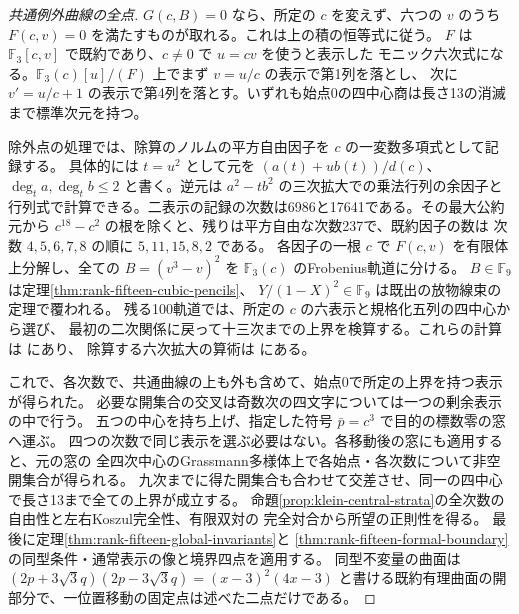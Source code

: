 \begin{proof}[共通例外曲線の全点]
$G(c,B)=0$ なら、所定の $c$ を変えず、六つの $v$ のうち
$F(c,v)=0$ を満たすものが取れる。これは上の積の恒等式に従う。
$F$ は $\mathbb F_3[c,v]$ で既約であり、$c\ne0$ で $u=cv$ を使うと表示した
モニック六次式になる。$\mathbb F_3(c)[u]/(F)$ 上でまず $v=u/c$ の表示で第1列を落とし、
次に $v'=u/c+1$ の表示で第4列を落とす。いずれも始点0の四中心商は長さ13の消滅まで標準次元を持つ。

除外点の処理では、除算のノルムの平方自由因子を $c$ の一変数多項式として記録する。
具体的には $t=u^2$ として元を $(a(t)+u b(t))/d(c)$、
$\deg_t a,\deg_t b\le2$ と書く。逆元は $a^2-t b^2$ の三次拡大での乗法行列の余因子と
行列式で計算できる。二表示の記録の次数は6986と17641である。その最大公約元から
$c^{18}-c^2$ の根を除くと、残りは平方自由な次数237で、既約因子の数は
次数 $4,5,6,7,8$ の順に $5,11,15,8,2$ である。
各因子の一根 $c$ で $F(c,v)$ を有限体上分解し、全ての $B=(v^3-v)^2$ を
$\mathbb F_3(c)$ のFrobenius軌道に分ける。
$B\in\mathbb F_9$ は定理\ref{thm:rank-fifteen-cubic-pencils}、
$Y/(1-X)^2\in\mathbb F_9$ は既出の放物線束の定理で覆われる。
残る100軌道では、所定の $c$ の六表示と規格化五列の四中心から選び、
最初の二次関係に戻って十三次までの上界を検算する。これらの計算は
 にあり、
除算する六次拡大の算術は  にある。

これで、各次数で、共通曲線の上も外も含めて、始点0で所定の上界を持つ表示が得られた。
必要な開集合の交叉は奇数次の四文字については一つの剰余表示の中で行う。
五つの中心を持ち上げ、指定した符号 $\bar p=c^3$ で目的の標数零の窓へ運ぶ。
四つの次数で同じ表示を選ぶ必要はない。各移動後の窓にも適用すると、元の窓の
全四次中心のGrassmann多様体上で各始点・各次数について非空開集合が得られる。
九次までに得た開集合も合わせて交差させ、同一の四中心で長さ13まで全ての上界が成立する。
命題\ref{prop:klein-central-strata}の全次数の自由性と左右Koszul完全性、有限双対の
完全対合から所望の正則性を得る。
最後に定理\ref{thm:rank-fifteen-global-invariants}と
\ref{thm:rank-fifteen-formal-boundary}の同型条件・通常表示の像と境界四点を適用する。
同型不変量の曲面は
$(2p+3\sqrt3q)(2p-3\sqrt3q)=(x-3)^2(4x-3)$
と書ける既約有理曲面の開部分で、一位置移動の固定点は述べた二点だけである。
\end{proof}
